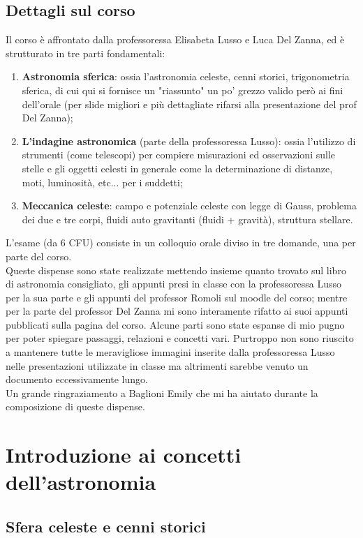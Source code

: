 \documentclass[a4paper, oneside]{book}
\begin{document}
\chapter*{Dettagli sul corso}
Il corso è affrontato dalla professoressa Elisabeta Lusso e Luca Del Zanna,
ed è strutturato in tre parti fondamentali:
\begin{enumerate}
    \item \textbf{Astronomia sferica}: ossia l'astronomia celeste, cenni storici,
    trigonometria sferica, di cui qui si fornisce un "riassunto" un po' grezzo 
    valido però ai fini dell'orale (per slide migliori e più dettagliate
    rifarsi alla presentazione del prof Del Zanna);
    \item \textbf{L'indagine astronomica} (parte della professoressa Lusso): ossia l'utilizzo di strumenti (come telescopi)
    per compiere misurazioni ed osservazioni sulle stelle e gli oggetti celesti in generale
    come la determinazione di distanze, moti, luminosità, etc... per i suddetti;
    \item \textbf{Meccanica celeste}: campo e potenziale celeste con
    legge di Gauss, problema dei due e tre corpi, fluidi auto gravitanti (fluidi + gravità),
    struttura stellare.
\end{enumerate}
L'esame (da 6 CFU) consiste in un colloquio orale diviso in tre domande,
una per parte del corso. \\ \noindent
Queste dispense sono state realizzate mettendo insieme quanto 
trovato sul libro di astronomia consigliato, gli appunti 
presi in classe con la professoressa Lusso per la sua parte e
gli appunti del professor Romoli sul moodle del corso; mentre per la parte
del professor Del Zanna mi sono interamente rifatto ai suoi appunti pubblicati 
sulla pagina del corso. Alcune parti sono state espanse di mio pugno 
per poter spiegare passaggi, relazioni e concetti vari. Purtroppo non sono 
riuscito a mantenere tutte le meravigliose immagini inserite dalla professoressa Lusso
nelle presentazioni utilizzate in classe ma altrimenti sarebbe venuto un documento eccessivamente lungo.  \\ \noindent
Un grande ringraziamento a Baglioni Emily che mi ha aiutato durante la composizione di
queste dispense. 


\part{Introduzione ai concetti dell'astronomia}
\chapter{Sfera celeste e cenni storici}
\end{document}

